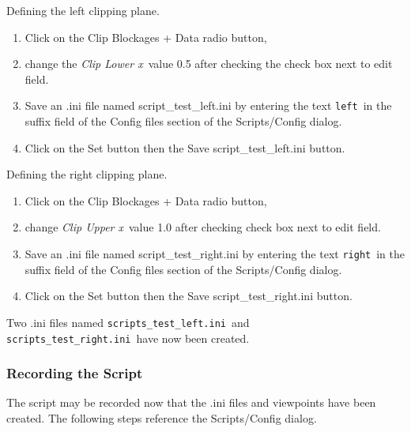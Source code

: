 \documentclass[11pt,twoside]{book}
\begin{document}
Defining the left clipping plane.
\begin{enumerate}
\item Click on the Clip Blockages + Data radio button,
\item change the {\em Clip Lower x}\ value 0.5 after checking the check box next to edit field.
\item Save an .ini file named script\_test\_left.ini by entering the text
{\tt left}\ in the suffix field of the Config files section of the Scripts/Config dialog.
\item Click on the Set button then the Save script\_test\_left.ini button.
\end{enumerate}

Defining the right clipping plane.
\begin{enumerate}
\item Click on the Clip Blockages + Data radio button,
\item change {\em Clip Upper x}\ value 1.0 after checking check box next to edit field.
\item Save an .ini file named script\_test\_right.ini by entering the text
{\tt right}\ in the suffix field of the Config files section of the Scripts/Config dialog.
\item Click on the Set button then the Save script\_test\_right.ini button.
\end{enumerate}

Two .ini files named {\tt scripts\_test\_left.ini}\
and {\tt scripts\_test\_right.ini}\ have
now been created.
\subsubsection{Recording the Script}
The script may be recorded now that the .ini files and viewpoints have been created.  The following steps reference the Scripts/Config dialog.
\end{document}
